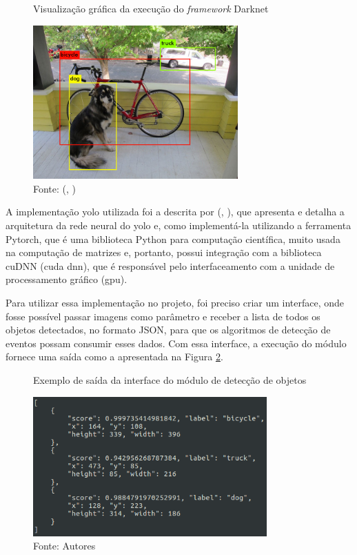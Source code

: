 \documentclass[]{politex}
\begin{document}
\begin{figure}[H]
    \centering
    \caption{Visualização gráfica da execução do \textit{framework} Darknet}
    \includegraphics[width=0.7\textwidth]{dog_yolo.jpg}
    \caption*{Fonte: (, \citeyear{yolo_git})}
    \label{fig:dog_yolo}
\end{figure}

A implementação \acrshort{yolo} utilizada foi a descrita por (, \citeyear{kathuria}), que apresenta e detalha a arquitetura da rede neural do \acrshort{yolo} e, como implementá-la utilizando a ferramenta Pytorch, que é uma biblioteca Python para computação científica, muito usada na computação de matrizes e, portanto, possui integração com a biblioteca cuDNN (\acrshort{cuda} \acrlong{dnn}), que é responsável pelo interfaceamento com a unidade de processamento gráfico (\acrshort{gpu}).

Para utilizar essa implementação no projeto, foi preciso criar um interface, onde fosse possível passar imagens como parâmetro e receber a lista de todos os objetos detectados, no formato JSON, para que os algoritmos de detecção de eventos possam consumir esses dados. Com essa interface, a execução do módulo fornece uma saída como a apresentada na Figura \ref{fig:interface_objetos}.

\begin{figure}[H]
    \centering
    \caption{Exemplo de saída da interface do módulo de detecção de objetos}
    \includegraphics[width=0.8\textwidth]{interface_detector}
    \caption*{Fonte: Autores}
    \label{fig:interface_objetos}
\end{figure}
\end{document}
